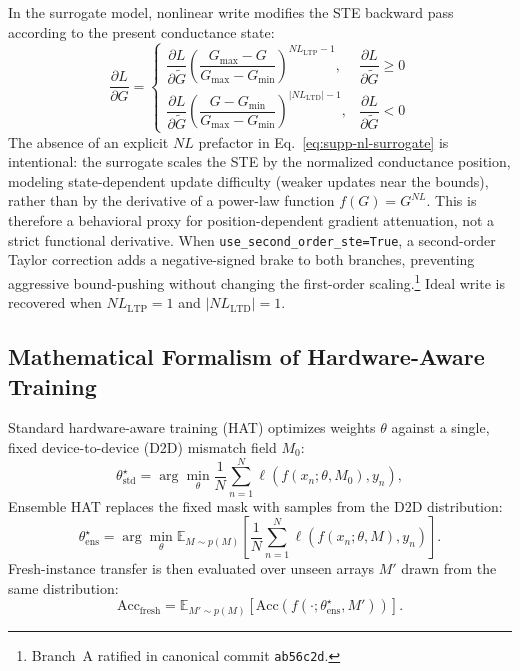 In the surrogate model, nonlinear write modifies the STE backward pass according to the present conductance state:
\begin{equation}
    \frac{\partial L}{\partial G}
    =
    \begin{cases}
        \dfrac{\partial L}{\partial \tilde{G}}
        \left(\dfrac{G_{\max}-G}{G_{\max}-G_{\min}}\right)^{NL_{\mathrm{LTP}}-1},
        & \dfrac{\partial L}{\partial \tilde{G}} \ge 0 \\[10pt]
        \dfrac{\partial L}{\partial \tilde{G}}
        \left(\dfrac{G-G_{\min}}{G_{\max}-G_{\min}}\right)^{|NL_{\mathrm{LTD}}|-1},
        & \dfrac{\partial L}{\partial \tilde{G}} < 0
    \end{cases}
\label{eq:supp-nl-surrogate}
\end{equation}
The absence of an explicit $NL$ prefactor in Eq.~\ref{eq:supp-nl-surrogate} is intentional: the surrogate scales the STE by the normalized conductance position, modeling state-dependent update difficulty (weaker updates near the bounds), rather than by the derivative of a power-law function $f(G)=G^{NL}$.
This is therefore a behavioral proxy for position-dependent gradient attenuation, not a strict functional derivative.
When \texttt{use\_second\_order\_ste=True}, a second-order Taylor correction adds a negative-signed brake to both branches, preventing aggressive bound-pushing without changing the first-order scaling.\footnote{Branch~A ratified in canonical commit \texttt{ab56c2d}.}
Ideal write is recovered when $NL_{\mathrm{LTP}}=1$ and $|NL_{\mathrm{LTD}}|=1$.


\subsection{Mathematical Formalism of Hardware-Aware Training}
\label{subsec:supp-hat-math}

Standard hardware-aware training (HAT) optimizes weights $\theta$ against a single, fixed device-to-device (D2D) mismatch field $M_0$:
\begin{equation}
    \theta_{\mathrm{std}}^{\star}=\arg\min_{\theta}\frac{1}{N}\sum_{n=1}^{N}\ell\!\left(f(x_{n};\theta,M_{0}),y_{n}\right),
\label{eq:hat-standard}
\end{equation}
Ensemble HAT replaces the fixed mask with samples from the D2D distribution:
\begin{equation}
    \theta_{\mathrm{ens}}^{\star}=\arg\min_{\theta}\mathbb{E}_{M\sim p(M)}
    \left[\frac{1}{N}\sum_{n=1}^{N}\ell\!\left(f(x_{n};\theta,M),y_{n}\right)\right].
\label{eq:hat-ensemble-distribution}
\end{equation}
Fresh-instance transfer is then evaluated over unseen arrays $M'$ drawn from the same distribution:
\begin{equation}
    \mathrm{Acc}_{\mathrm{fresh}}=\mathbb{E}_{M'\sim p(M)}\!\left[\mathrm{Acc}\!\left(f(\cdot;\theta_{\mathrm{ens}}^{\star},M')\right)\right].
\label{eq:fresh-instance}
\end{equation}

